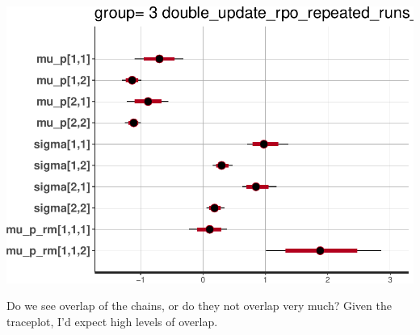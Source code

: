 \documentclass[]{article}
\begin{document}
\includegraphics{compare_vb_and_MCMC_files/figure-latex/StanPlotLogResults-4.pdf}

Do we see overlap of the chains, or do they not overlap very much? Given
the traceplot, I'd expect high levels of overlap.
\end{document}
